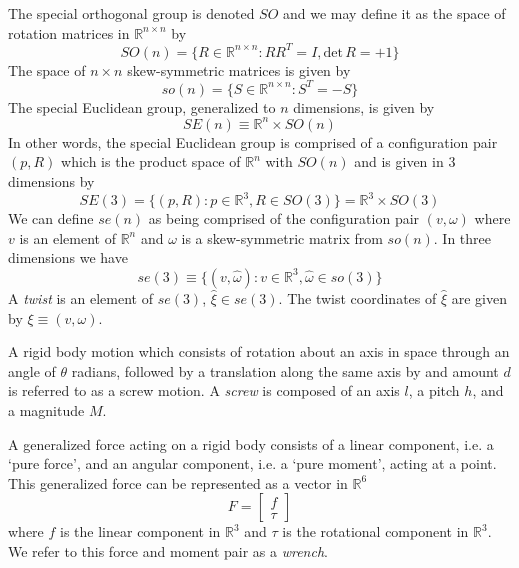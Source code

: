 \documentclass[11pt]{book}
\theoremstyle{example}
\begin{document}
The special orthogonal group is denoted $SO$ and we may define it as the space of rotation matrices in $\mathbb{R}^{n{\times}n}$ by
\begin{equation}
	SO(n)=\{R\in\mathbb{R}^{n{\times}n}:RR^T=I,\mathrm{det}\,R=+1\}
\end{equation}
The space of $n{\times}n$ skew-symmetric matrices is given by
\begin{equation}
	so(n)=\{S\in\mathbb{R}^{n{\times}n}:S^T=-S\}
\end{equation}
The special Euclidean group, generalized to $n$ dimensions, is given by
\begin{equation}
	SE(n)\equiv\mathbb{R}^n\times{SO(n)}
\end{equation}
In other words, the special Euclidean group is comprised of a configuration pair $(p, R)$ which is the product space of $\mathbb{R}^n$ with $SO(n)$ and is given in 3 dimensions by
\begin{equation}
	SE(3)=\{(p,R):p\in\mathbb{R}^3,R\in{SO(3)}\}=\mathbb{R}^3\times{SO(3)}
\end{equation}
We can define $se(n)$ as being comprised of the configuration pair $(v, \omega)$ where $v$ is an element of $\mathbb{R}^n$ and $\omega$ is a skew-symmetric matrix from $so(n)$. In three dimensions we have
\begin{equation}
	se(3)\equiv\{(v,\hat{\omega}):v\in\mathbb{R}^3,\hat{\omega}\in{so(3)}\}
\end{equation}
A \emph{twist} is an element of $se(3)$, $\hat{\xi}\in{se(3)}$. The twist coordinates of $\hat{\xi}$ are given by $\xi\equiv(v,\omega)$.

A rigid body motion which consists of rotation about an axis in space through an angle of $\theta$ radians, followed by a translation along the same axis by and amount $d$ is referred to as a screw motion. A \emph{screw} is composed of an axis $l$, a pitch $h$, and a magnitude $M$.

A generalized force acting on a rigid body consists of a linear component, i.e. a `pure force', and an angular component, i.e. a `pure moment', acting at a point. This generalized force can  be represented as a vector in $\mathbb{R}^6$
\begin{equation}
	F=
	\begin{bmatrix}
		f\\
		\tau
	\end{bmatrix}
\end{equation}
where $f$ is the linear component in $\mathbb{R}^3$ and $\tau$ is the rotational component in $\mathbb{R}^3$. We refer to this force and moment pair as a \emph{wrench}.
\end{document}
